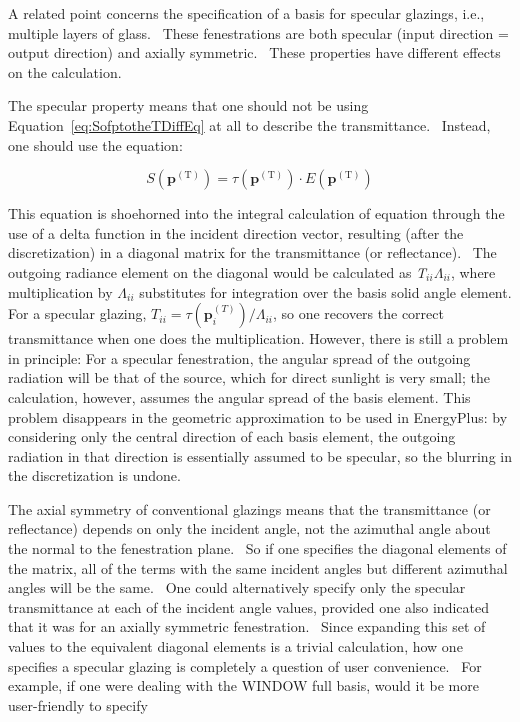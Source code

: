 A related point concerns the specification of a basis for specular glazings, i.e., multiple layers of glass.~ These fenestrations are both specular (input direction = output direction) and axially symmetric.~ These properties have different effects on the calculation.

The specular property means that one should not be using Equation~\ref{eq:SofptotheTDiffEq} at all to describe the transmittance.~ Instead, one should use the equation:

\begin{equation}
S({{\mathbf{p}}^{{\mathrm{(T)}}}}) = \tau ({{\mathbf{p}}^{{\mathrm{(T)}}}}) \cdot E({{\mathbf{p}}^{{\mathrm{(T)}}}})
\end{equation}

This equation is shoehorned into the integral calculation of equation through the use of a delta function in the incident direction vector, resulting (after the discretization) in a diagonal matrix for the transmittance (or reflectance).~ The outgoing radiance element on the diagonal would be calculated as \emph{T\(_{ii}\)}\emph{\(\Lambda\)\(_{ii}\)}, where multiplication by \emph{\(\Lambda\)\(_{ii}\)} substitutes for integration over the basis solid angle element. For a specular glazing, \(T_{ii} = \tau(\mathbf{p}_i^{(T)})/\Lambda_{ii}\), so one recovers the correct transmittance when one does the multiplication. However, there is still a problem in principle: For a specular fenestration, the angular spread of the outgoing radiation will be that of the source, which for direct sunlight is very small; the calculation, however, assumes the angular spread of the basis element. This problem disappears in the geometric approximation to be used in EnergyPlus: by considering only the central direction of each basis element, the outgoing radiation in that direction is essentially assumed to be specular, so the blurring in the discretization is undone.

The axial symmetry of conventional glazings means that the transmittance (or reflectance) depends on only the incident angle, not the azimuthal angle about the normal to the fenestration plane.~ So if one specifies the diagonal elements of the matrix, all of the terms with the same incident angles but different azimuthal angles will be the same.~ One could alternatively specify only the specular transmittance at each of the incident angle values, provided one also indicated that it was for an axially symmetric fenestration.~ Since expanding this set of values to the equivalent diagonal elements is a trivial calculation, how one specifies a specular glazing is completely a question of user convenience.~ For example, if one were dealing with the WINDOW full basis, would it be more user-friendly to specify

